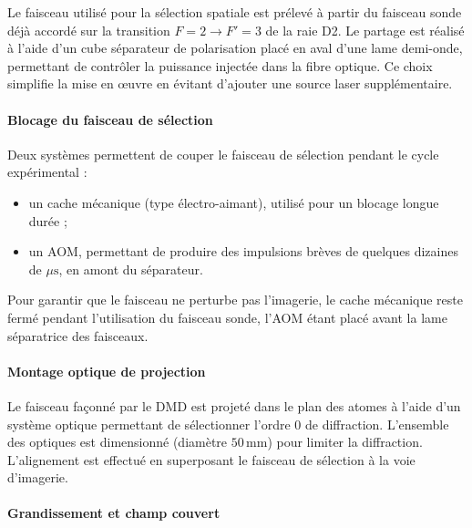 Le faisceau utilisé pour la sélection spatiale est prélevé à partir du faisceau sonde déjà accordé sur la transition \(F=2 \rightarrow F'=3\) de la raie D2. Le partage est réalisé à l’aide d’un cube séparateur de polarisation placé en aval d’une lame demi-onde, permettant de contrôler la puissance injectée dans la fibre optique. Ce choix simplifie la mise en œuvre en évitant d’ajouter une source laser supplémentaire.

\paragraph{Blocage du faisceau de sélection}

Deux systèmes permettent de couper le faisceau de sélection pendant le cycle expérimental :
\begin{itemize}[label=$\bullet$]
    \item un cache mécanique (type électro-aimant), utilisé pour un blocage longue durée ;
    \item un  \gls{AOM}, permettant de produire des impulsions brèves de quelques dizaines de \(\mu\mathrm{s}\), en amont du séparateur.
\end{itemize}

Pour garantir que le faisceau ne perturbe pas l’imagerie, le cache mécanique reste fermé pendant l’utilisation du faisceau sonde, l’\gls*{AOM} étant placé avant la lame séparatrice des faisceaux.

\paragraph{Montage optique de projection}

Le faisceau façonné par le \gls*{DMD} est projeté dans le plan des atomes à l’aide d’un système optique permettant de sélectionner l’ordre 0 de diffraction. L’ensemble des optiques est dimensionné (diamètre \(50\,\mathrm{mm}\)) pour limiter la diffraction. L’alignement est effectué en superposant le faisceau de sélection à la voie d’imagerie.

\paragraph{Grandissement et champ couvert}

